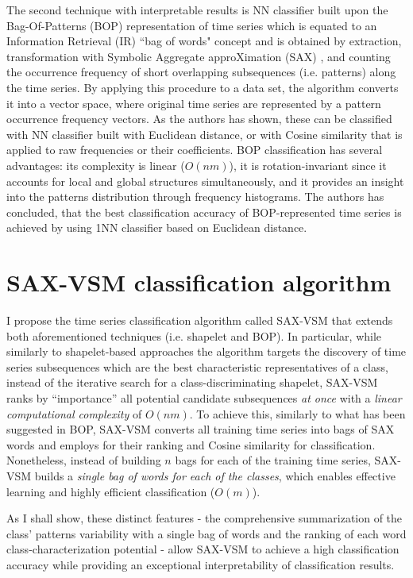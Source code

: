The second technique with interpretable results is NN classifier built upon the Bag-Of-Patterns (BOP) representation of time series 
\cite{citeulike:10525778} which is equated to an Information Retrieval (IR) ``bag of words" concept and is obtained by extraction, 
transformation with Symbolic Aggregate approXimation (SAX) \cite{sax}, and counting the occurrence frequency of short overlapping 
subsequences (i.e. patterns) along the time series.
By applying this procedure to a data set, the algorithm converts it into a vector space, where original time series are 
represented by a pattern occurrence frequency vectors. As the authors has shown, these can be classified with NN classifier built with 
Euclidean distance, or with Cosine similarity that is applied to raw frequencies or their \tfidf coefficients. 
BOP classification has several advantages: its complexity is linear ($O(nm)$), it is rotation-invariant since it accounts for local and 
global structures simultaneously, and it provides an insight into the patterns distribution through frequency histograms.
The authors has concluded, that the best classification accuracy of BOP-represented time series is achieved by using 1NN classifier 
based on Euclidean distance. 

\section{SAX-VSM classification algorithm} \label{sax_vsm_background}
I propose the time series classification algorithm called \mbox{SAX-VSM} that extends both aforementioned techniques (i.e. shapelet and BOP). 
In particular, while similarly to shapelet-based approaches the algorithm targets the discovery of time series subsequences which 
are the best characteristic representatives of a class, 
instead of the iterative search for a class-discriminating shapelet, \mbox{SAX-VSM} ranks by “importance” all potential candidate 
subsequences \textit{at once} with a \textit{linear computational complexity} of $O(nm)$.
To achieve this, similarly to what has been suggested in BOP, \mbox{SAX-VSM} converts all training time series into bags of SAX 
words and employs \tfidf for their ranking and Cosine similarity for classification. 
Nonetheless, instead of building $n$ bags for each of the training time series, SAX-VSM builds a 
\textit{single bag of words for each of the classes}, which enables effective learning and highly efficient classification ($O(m)$).

As I shall show, these distinct features - the comprehensive summarization of the class' patterns variability with a single bag 
of words and the ranking of each word class-characterization potential - allow SAX-VSM to achieve a high classification accuracy
while providing an exceptional interpretability of classification results.

